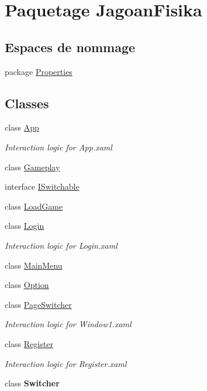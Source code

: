 \hypertarget{namespace_jagoan_fisika}{\section{Paquetage Jagoan\+Fisika}
\label{namespace_jagoan_fisika}
}
\subsection*{Espaces de nommage}
\begin{DoxyCompactItemize}
\item 
package \hyperlink{namespace_jagoan_fisika_1_1_properties}{Properties}
\end{DoxyCompactItemize}
\subsection*{Classes}
\begin{DoxyCompactItemize}
\item 
class \hyperlink{class_jagoan_fisika_1_1_app}{App}
\begin{DoxyCompactList}\small\item\em Interaction logic for App.\+xaml \end{DoxyCompactList}\item 
class \hyperlink{class_jagoan_fisika_1_1_gameplay}{Gameplay}
\item 
interface \hyperlink{interface_jagoan_fisika_1_1_i_switchable}{I\+Switchable}
\item 
class \hyperlink{class_jagoan_fisika_1_1_load_game}{Load\+Game}
\item 
class \hyperlink{class_jagoan_fisika_1_1_login}{Login}
\begin{DoxyCompactList}\small\item\em Interaction logic for Login.\+xaml \end{DoxyCompactList}\item 
class \hyperlink{class_jagoan_fisika_1_1_main_menu}{Main\+Menu}
\item 
class \hyperlink{class_jagoan_fisika_1_1_option}{Option}
\item 
class \hyperlink{class_jagoan_fisika_1_1_page_switcher}{Page\+Switcher}
\begin{DoxyCompactList}\small\item\em Interaction logic for Window1.\+xaml \end{DoxyCompactList}\item 
class \hyperlink{class_jagoan_fisika_1_1_register}{Register}
\begin{DoxyCompactList}\small\item\em Interaction logic for Register.\+xaml \end{DoxyCompactList}\item 
class {\bfseries Switcher}
\end{DoxyCompactItemize}

